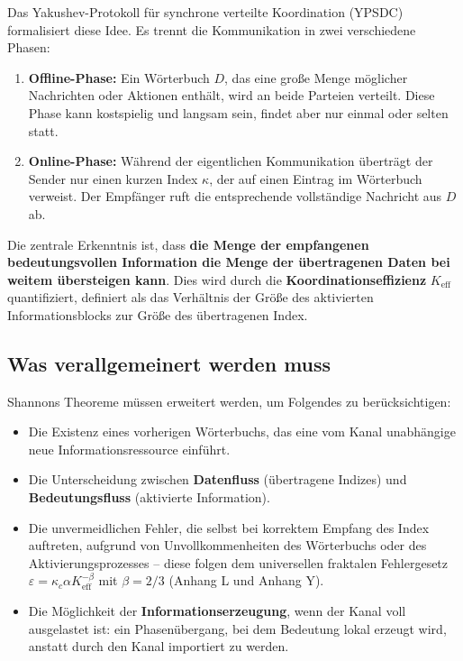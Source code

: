\documentclass[12pt,a4paper]{article}
\theoremstyle{remark}
\newcommand{\Keff}{K_{\mathrm{eff}}}
\begin{document}
	Das Yakushev-Protokoll für synchrone verteilte Koordination (YPSDC) \cite{Yakushev2026a, AppendixB} formalisiert diese Idee. Es trennt die Kommunikation in zwei verschiedene Phasen:
	\begin{enumerate}
		\item \textbf{Offline-Phase:} Ein Wörterbuch $D$, das eine große Menge möglicher Nachrichten oder Aktionen enthält, wird an beide Parteien verteilt. Diese Phase kann kostspielig und langsam sein, findet aber nur einmal oder selten statt.
		\item \textbf{Online-Phase:} Während der eigentlichen Kommunikation überträgt der Sender nur einen kurzen Index $\kappa$, der auf einen Eintrag im Wörterbuch verweist. Der Empfänger ruft die entsprechende vollständige Nachricht aus $D$ ab.
	\end{enumerate}
	Die zentrale Erkenntnis ist, dass \textbf{die Menge der empfangenen bedeutungsvollen Information die Menge der übertragenen Daten bei weitem übersteigen kann}. Dies wird durch die \textbf{Koordinationseffizienz} $\Keff$ quantifiziert, definiert als das Verhältnis der Größe des aktivierten Informationsblocks zur Größe des übertragenen Index.
	
	\subsection{Was verallgemeinert werden muss}
	
	Shannons Theoreme müssen erweitert werden, um Folgendes zu berücksichtigen:
	\begin{itemize}
		\item Die Existenz eines vorherigen Wörterbuchs, das eine vom Kanal unabhängige neue Informationsressource einführt.
		\item Die Unterscheidung zwischen \textbf{Datenfluss} (übertragene Indizes) und \textbf{Bedeutungsfluss} (aktivierte Information).
		\item Die unvermeidlichen Fehler, die selbst bei korrektem Empfang des Index auftreten, aufgrund von Unvollkommenheiten des Wörterbuchs oder des Aktivierungsprozesses – diese folgen dem universellen fraktalen Fehlergesetz $\varepsilon = \kappa_c\alpha K_{\mathrm{eff}}^{-\beta}$ mit $\beta=2/3$ (Anhang L und Anhang Y).
		\item Die Möglichkeit der \textbf{Informationserzeugung}, wenn der Kanal voll ausgelastet ist: ein Phasenübergang, bei dem Bedeutung lokal erzeugt wird, anstatt durch den Kanal importiert zu werden.
	\end{itemize}
	
\end{document}
